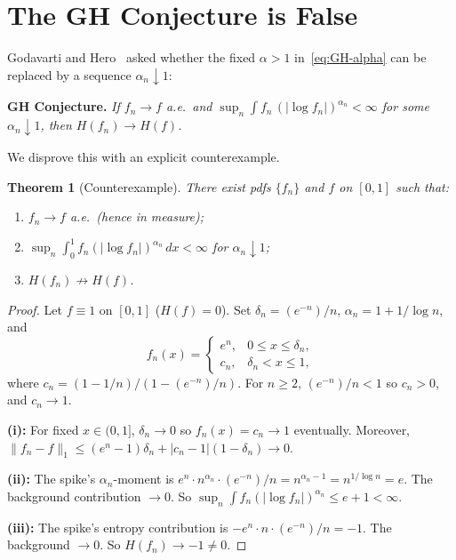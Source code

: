 \documentclass[journal]{IEEEtran}
\newtheorem{theorem}{Theorem}
\theoremstyle{definition}
\theoremstyle{remark}
\newcommand{\1}{\mathbf{1}}
\newcommand{\Hent}{H}
\newcommand{\abs}[1]{\lvert #1 \rvert}
\newcommand{\norm}[1]{\lVert #1 \rVert}
\newcommand{\dx}{\,dx}
\begin{document}
\section{The GH Conjecture is False}\label{sec:counter}

Godavarti and Hero~\cite{GodavartiHero2004} asked whether
the fixed $\alpha > 1$ in~\eqref{eq:GH-alpha} can be replaced
by a sequence $\alpha_n \downarrow 1$:

\medskip\noindent
\textbf{GH Conjecture.}\;
\emph{If\/ $f_n \to f$ a.e.\ and\/
$\sup_n \int f_n\, (\abs{\log f_n})^{\alpha_n} < \infty$
for some $\alpha_n \downarrow 1$, then
$\Hent(f_n) \to \Hent(f)$.}

\medskip
We disprove this with an explicit counterexample.

\begin{theorem}[Counterexample]\label{thm:counter}
There exist pdfs $\{f_n\}$ and $f$ on $[0,1]$ such that:
\begin{enumerate}
\item[\textup{(i)}] $f_n \to f$ a.e.\ (hence in measure);
\item[\textup{(ii)}] $\sup_n \int_0^1 f_n
  (\abs{\log f_n})^{\alpha_n} \dx < \infty$
  for $\alpha_n \downarrow 1$;
\item[\textup{(iii)}] $\Hent(f_n) \not\to \Hent(f)$.
\end{enumerate}
\end{theorem}

\begin{proof}
Let $f \equiv 1$ on $[0,1]$ ($\Hent(f) = 0$).  Set
$\delta_n = (e^{-n})/n$,
$\alpha_n = 1 + 1/\log n$, and
\begin{equation}\label{eq:fn-def}
  f_n(x) =
  \begin{cases}
    e^n, & 0 \leq x \leq \delta_n, \\
    c_n, & \delta_n < x \leq 1,
  \end{cases}
\end{equation}
where $c_n = (1 - 1/n)/(1 - (e^{-n})/n)$.
For $n \geq 2$, $(e^{-n})/n < 1$ so $c_n > 0$, and $c_n \to 1$.

\medskip\noindent
\textbf{(i):} For fixed $x \in (0,1]$, $\delta_n \to 0$ so
$f_n(x) = c_n \to 1$ eventually.
Moreover, $\norm{f_n - f}_1 \leq (e^n - 1)\delta_n +
\abs{c_n - 1}(1 - \delta_n) \to 0$.

\medskip\noindent
\textbf{(ii):} The spike's $\alpha_n$-moment is
$e^n \cdot n^{\alpha_n} \cdot (e^{-n})/n = n^{\alpha_n - 1}
= n^{1/\log n} = e$.
The background contribution $\to 0$.  So
$\sup_n \int f_n (\abs{\log f_n})^{\alpha_n} \leq e + 1 < \infty$.

\medskip\noindent
\textbf{(iii):} The spike's entropy contribution is
$-e^n \cdot n \cdot (e^{-n})/n = -1$.
The background $\to 0$.  So $\Hent(f_n) \to -1 \neq 0$.
\end{proof}
\end{document}
